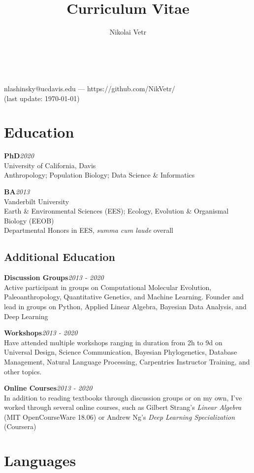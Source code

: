 \documentclass[12pt]{article}
\makeatletter
\newcommand{\cvcolor}{\color{Maroon}} %
\renewcommand{\maketitle}{
\begin{center}
{\Huge\theauthor}\\
{\Large \cvcolor{University of California, Davis}}\\

nlashinsky@ucdavis.edu --- https://github.com/NikVetr/\\
\vspace{0.25em}
{\color{Gray}(last update: \today)}
\end{center}
}
\makeatother
\begin{document}
\title{Curriculum Vitae} %
\author{Nikolai Vetr}

\maketitle

\section{Education}

\textbf{PhD}\hfill\emph{2020}\\
University of California, Davis\\
Anthropology; Population Biology; Data Science \& Informatics

\textbf{BA}\hfill\emph{2013}\\
Vanderbilt University\\
Earth \& Environmental Sciences (EES); Ecology, Evolution \& Organismal Biology (EEOB)\\
Departmental Honors in EES, \textit{summa cum laude} overall\\
\vspace{-1.25em}
\subsection{Additional Education}

\textbf{Discussion Groups}\hfill\emph{2013 - 2020}\\
Active participant in groups on Computational Molecular Evolution, Paleoanthropology, Quantitative Genetics, and Machine Learning. Founder and lead in groups on Python, Applied Linear Algebra, Bayesian Data Analysis, and Deep Learning

\textbf{Workshops}\hfill\emph{2013 - 2020}\\
Have attended multiple workshops ranging in duration from 2h to 9d on Universal Design, Science Communication, Bayesian Phylogenetics, Database Management, Natural Language Processing, Carpentries Instructor Training, and other topics.

\textbf{Online Courses}\hfill\emph{2013 - 2020}\\
In addition to reading textbooks through discussion groups or on my own, I've worked through several online courses, such as Gilbert Strang's \emph{Linear Algebra} (MIT OpenCourseWare 18.06) or Andrew Ng's \emph{Deep Learning Specialization} (Coursera)

\section{Languages}
\end{document}
